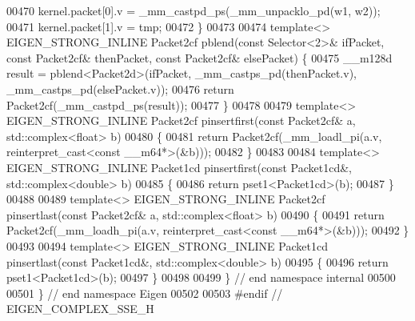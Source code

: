 \begin{DoxyCode}
00470   kernel.packet[0].v = \_mm\_castpd\_ps(\_mm\_unpacklo\_pd(w1, w2));
00471   kernel.packet[1].v = tmp;
00472 \}
00473 
00474 \textcolor{keyword}{template}<>  EIGEN\_STRONG\_INLINE Packet2cf pblend(\textcolor{keyword}{const} Selector<2>& ifPacket, \textcolor{keyword}{const} Packet2cf& thenPacket, \textcolor{keyword}{
      const} Packet2cf& elsePacket) \{
00475   \_\_m128d result = pblend<Packet2d>(ifPacket, \_mm\_castps\_pd(thenPacket.v), \_mm\_castps\_pd(elsePacket.v));
00476   \textcolor{keywordflow}{return} Packet2cf(\_mm\_castpd\_ps(result));
00477 \}
00478 
00479 \textcolor{keyword}{template}<> EIGEN\_STRONG\_INLINE Packet2cf pinsertfirst(\textcolor{keyword}{const} Packet2cf& a, std::complex<float> b)
00480 \{
00481   \textcolor{keywordflow}{return} Packet2cf(\_mm\_loadl\_pi(a.v, reinterpret\_cast<const \_\_m64*>(&b)));
00482 \}
00483 
00484 \textcolor{keyword}{template}<> EIGEN\_STRONG\_INLINE Packet1cd pinsertfirst(\textcolor{keyword}{const} Packet1cd&, std::complex<double> b)
00485 \{
00486   \textcolor{keywordflow}{return} pset1<Packet1cd>(b);
00487 \}
00488 
00489 \textcolor{keyword}{template}<> EIGEN\_STRONG\_INLINE Packet2cf pinsertlast(\textcolor{keyword}{const} Packet2cf& a, std::complex<float> b)
00490 \{
00491   \textcolor{keywordflow}{return} Packet2cf(\_mm\_loadh\_pi(a.v, reinterpret\_cast<const \_\_m64*>(&b)));
00492 \}
00493 
00494 \textcolor{keyword}{template}<> EIGEN\_STRONG\_INLINE Packet1cd pinsertlast(\textcolor{keyword}{const} Packet1cd&, std::complex<double> b)
00495 \{
00496   \textcolor{keywordflow}{return} pset1<Packet1cd>(b);
00497 \}
00498 
00499 \} \textcolor{comment}{// end namespace internal}
00500 
00501 \} \textcolor{comment}{// end namespace Eigen}
00502 
00503 \textcolor{preprocessor}{#endif // EIGEN\_COMPLEX\_SSE\_H}
\end{DoxyCode}

